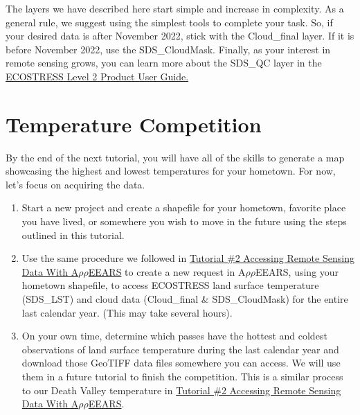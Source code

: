 \documentclass[oneside,a4paper,11pt,explicit]{book}
\begin{document}
	\vspace{.5em}
	
	The layers we have described here start simple and increase in complexity. As a general rule, we suggest using the simplest tools to complete your task. So, if your desired data is after November 2022, stick with the Cloud\_final layer. If it is before November 2022, use the SDS\_CloudMask. Finally, as your interest in remote sensing grows, you can learn more about the SDS\_QC layer in the \href{https://lpdaac.usgs.gov/documents/423/ECO2_User_Guide_V1.pdf}{ECOSTRESS Level 2 Product User Guide.}
	
	\section{Temperature Competition}
	
	By the end of the next tutorial, you will have all of the skills to generate a map showcasing the highest and lowest temperatures for your hometown. For now, let's focus on acquiring the data.
	
	\begin{tcolorbox}[colback=yellow!5!white,colframe=IceCreamLeaf,title=\textbf{Temperature Competition Instructions}]
		\begin{enumerate}
			\item Start a new project and create a shapefile for your hometown, favorite place you have lived, or somewhere you wish to move in the future using the steps outlined in this tutorial.
			\item  Use the same procedure we followed in \href{https://jeremydforsythe.github.io/icecream-tutorials/Tutorial2_AccessingRemoteSensingDataWithAppears/Tutorial2_AccessingRemoteSensingDataWithAppears.pdf}{Tutorial \#2 Accessing Remote Sensing Data With A$\rho\rho$EEARS} to create a new request in A$\rho\rho$EEARS, using your hometown shapefile, to access ECOSTRESS land surface temperature (SDS\_LST) and cloud data (Cloud\_final \& SDS\_CloudMask)  for the entire last calendar year. (This may take several hours).
			\item On your own time, determine which passes have the hottest and coldest observations of land surface temperature during the last calendar year and download those GeoTIFF data files somewhere you can access. We will use them in a future tutorial to finish the competition. This is a similar process to our Death Valley temperature in \href{https://jeremydforsythe.github.io/icecream-tutorials/Tutorial2_AccessingRemoteSensingDataWithAppears/Tutorial2_AccessingRemoteSensingDataWithAppears.pdf}{Tutorial \#2 Accessing Remote Sensing Data With A$\rho\rho$EEARS}.  
		\end{enumerate}
		
		
	\end{tcolorbox} 
\end{document}
